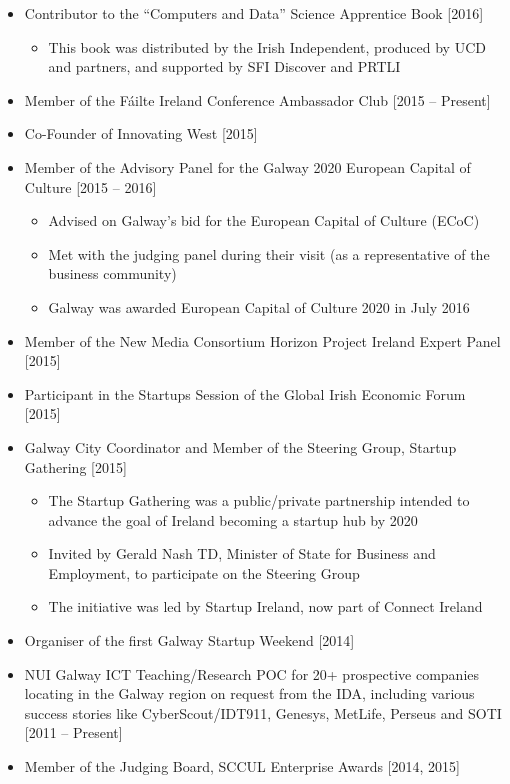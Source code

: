 \documentclass[10pt,a4paper]{res} %
\begin{document}
\begin{resume}
\begin{itemize}
\item Contributor to the ``Computers and Data'' Science Apprentice Book [2016]
\begin{itemize} \itemsep -2pt
\item This book was distributed by the Irish Independent, produced by UCD and partners, and supported by SFI Discover and PRTLI
\end{itemize}
\item Member of the F\'{a}ilte Ireland Conference Ambassador Club [2015 -- Present]
\item Co-Founder of Innovating West [2015]
\item Member of the Advisory Panel for the Galway 2020 European Capital of Culture [2015 -- 2016]
\begin{itemize} \itemsep -2pt
\item Advised on Galway's bid for the European Capital of Culture (ECoC)
\item Met with the judging panel during their visit (as a representative of the business community)
\item Galway was awarded European Capital of Culture 2020 in July 2016
\end{itemize}
\item Member of the New Media Consortium Horizon Project Ireland Expert Panel [2015]
\item Participant in the Startups Session of the Global Irish Economic Forum [2015]
\item Galway City Coordinator and Member of the Steering Group, Startup Gathering [2015]
\begin{itemize} \itemsep -2pt
\item The Startup Gathering was a public/private partnership intended to advance the goal of Ireland becoming a startup hub by 2020
\item Invited by Gerald Nash TD, Minister of State for Business and Employment, to participate on the Steering Group
\item The initiative was led by Startup Ireland, now part of Connect Ireland
\end{itemize}
\item Organiser of the first Galway Startup Weekend [2014]
\item NUI Galway ICT Teaching/Research POC for 20+ prospective companies locating in the Galway region on request from the IDA, including various success stories like CyberScout/IDT911, Genesys, MetLife, Perseus and SOTI [2011 -- Present]
\item Member of the Judging Board, SCCUL Enterprise Awards [2014, 2015]

\end{itemize}
\end{resume}
\end{document}
